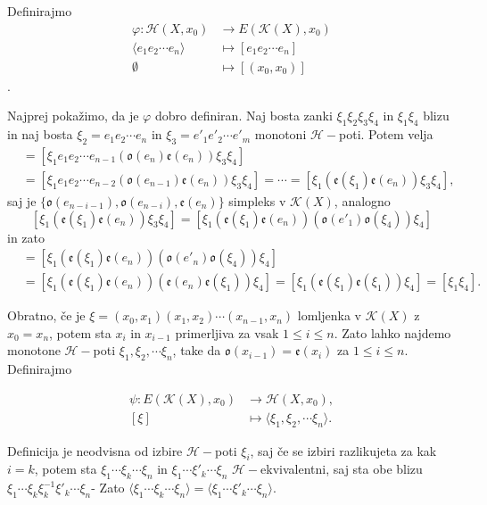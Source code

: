 \documentclass[mat1]{fmfdelo}
\DeclareRobustCommand{\h}{
    \mathcal{H}}
\begin{document}
\begin{dokaz}
    Definirajmo 
    \begin{align*}
\varphi\colon \mathscr{H}(X,x_0)&\rightarrow E(\mathcal{K}(X),x_0)\\
\langle e_1e_2 \cdots e_n\rangle&\mapsto [e_1e_2 \cdots e_n]\\
\emptyset &\mapsto [(x_0,x_0)]
    \end{align*}.

    Najprej pokažimo, da je $\varphi$ dobro definiran.
    Naj bosta zanki $\xi_1 \xi_2 \xi_3 \xi_4$ in $\xi_1 \xi_4 $ blizu in naj bosta $\xi_2 = e_1e_2 \cdots e_n$ in $\xi_3 = e'_1e'_2 \cdots e'_m$ monotoni $\h-$poti. Potem velja 
\begin{align*}
    [\xi_1 \xi_2 \xi_3 \xi_4]&=[\xi_1 e_1e_2 \cdots e_{n-1}(\mathfrak{o}(e_n)\mathfrak{e}(e_n)) \xi_3 \xi_4]\\
    &=[\xi_1 e_1e_2 \cdots e_{n-2}(\mathfrak{o}(e_{n-1})\mathfrak{e}(e_n)) \xi_3 \xi_4]=\cdots=[\xi_1(\mathfrak{e}(\xi_1)\mathfrak{e}(e_n)) \xi_3 \xi_4],
\end{align*}
saj je $\{\mathfrak{o}(e_{n-i-1}),\mathfrak{o}(e_{n-i}),\mathfrak{e}(e_{n})\}$ simpleks v $\mathcal{K}(X)$, analogno 
$$
[\xi_1(\mathfrak{e}(\xi_1)\mathfrak{e}(e_n)) \xi_3 \xi_4]=[\xi_1(\mathfrak{e}(\xi_1)\mathfrak{e}(e_n))( \mathfrak{o}(e'_1)\mathfrak{o}(\xi_4)) \xi_4]
$$
in zato 
\begin{align*}
    [\xi_1 \xi_2 \xi_3 \xi_4]&=[\xi_1(\mathfrak{e}(\xi_1)\mathfrak{e}(e_n)) (\mathfrak{o}(e'_n)\mathfrak{o}(\xi_4)) \xi_4]\\
    &=[\xi_1(\mathfrak{e}(\xi_1)\mathfrak{e}(e_n)) (\mathfrak{e}(e_n)\mathfrak{e}(\xi_1)) \xi_4]=[\xi_1(\mathfrak{e}(\xi_1) \mathfrak{e}(\xi_1)) \xi_4]=[\xi_1 \xi_4].
\end{align*}


Obratno, če je $\xi =(x_0,x_1)(x_1,x_2) \cdots (x_{n-1},x_n)$ lomljenka v $\mathcal{K}(X)$ z $x_0=x_n$, potem sta $x_i$ in $x_{i-1}$ primerljiva za vsak $1\leq i \leq n$. Zato lahko najdemo monotone $\h-$poti $\xi_1, \xi_2, \cdots  \xi_n$, take da $\mathfrak{o}(x_{i-1})=\mathfrak{e}(x_i)$ za $1\leq i \leq n$. Definirajmo

\begin{align*}
    \psi\colon  E(\mathcal{K}(X),x_0)&\rightarrow \mathscr{H}(X,x_0),\\
    [\xi]&\mapsto \langle\xi_1, \xi_2, \cdots  \xi_n\rangle.
\end{align*}

Definicija je neodvisna od izbire $\h-$poti $\xi_i$, saj če se izbiri razlikujeta za kak $i=k$, potem sta $\xi_1 \cdots \xi_k \cdots \xi_n$ in $\xi_1 \cdots \xi'_k \cdots \xi_n$ $\h-$ekvivalentni, saj sta obe blizu $\xi_1 \cdots \xi_k\xi_k^{-1}\xi'_k \cdots \xi_n$- Zato $\langle \xi_1 \cdots \xi_k \cdots \xi_n \rangle = \langle \xi_1 \cdots \xi'_k \cdots \xi_n \rangle$.


\end{dokaz}
\end{document}
